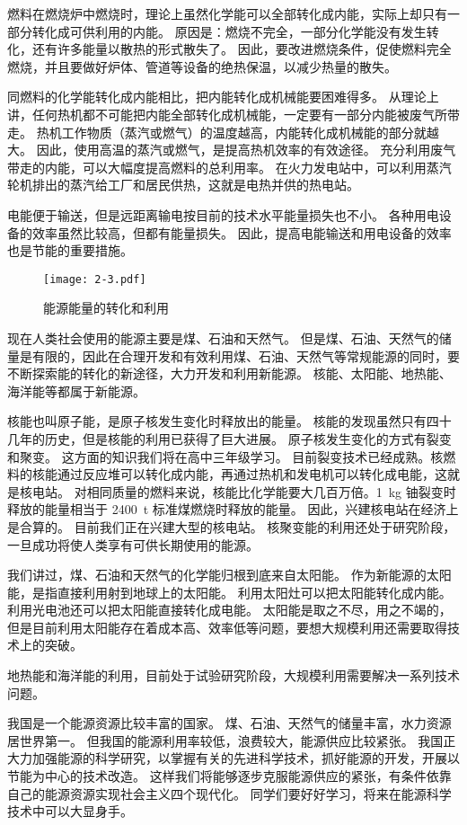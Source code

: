 燃料在燃烧炉中燃烧时，理论上虽然化学能可以全部转化成内能，实际上却只有一部分转化成可供利用的内能。
原因是：燃烧不完全，一部分化学能没有发生转化，还有许多能量以散热的形式散失了。
因此，要改进燃烧条件，促使燃料完全燃烧，并且要做好炉体、管道等设备的绝热保温，以减少热量的散失。

同燃料的化学能转化成内能相比，把内能转化成机械能要困难得多。
从理论上讲，任何热机都不可能把内能全部转化成机械能，一定要有一部分内能被废气所带走。
热机工作物质（蒸汽或燃气）的温度越高，内能转化成机械能的部分就越大。
因此，使用高温的蒸汽或燃气，是提高热机效率的有效途径。
充分利用废气带走的内能，可以大幅度提高燃料的总利用率。
在火力发电站中，可以利用蒸汽轮机排出的蒸汽给工厂和居民供热，这就是电热并供的热电站。

电能便于输送，但是远距离输电按目前的技术水平能量损失也不小。
各种用电设备的效率虽然比较高，但都有能量损失。
因此，提高电能输送和用电设备的效率也是节能的重要措施。

\begin{figure}
	\texttt{[image: 2-3.pdf]}
	\caption{能源能量的转化和利用}\label{fig:2-3}
\end{figure}

现在人类社会使用的能源主要是煤、石油和天然气。
但是煤、石油、天然气的储量是有限的，因此在合理开发和有效利用煤、石油、天然气等常规能源的同时，要不断探索能的转化的新途径，大力开发和利用新能源。
核能、太阳能、地热能、海洋能等都属于新能源。

核能也叫原子能，是原子核发生变化时释放出的能量。
核能的发现虽然只有四十几年的历史，但是核能的利用已获得了巨大进展。
原子核发生变化的方式有裂变和聚变。
这方面的知识我们将在高中三年级学习。
目前裂变技术已经成熟。核燃料的核能通过反应堆可以转化成内能，再通过热机和发电机可以转化成电能，这就是核电站。
对相同质量的燃料来说，核能比化学能要大几百万倍。\qty{1}{kg} 铀裂变时释放的能量相当于 \qty{2400}{t} 标准煤燃烧时释放的能量。
因此，兴建核电站在经济上是合算的。
目前我们正在兴建大型的核电站。
核聚变能的利用还处于研究阶段，一旦成功将使人类享有可供长期使用的能源。

我们讲过，煤、石油和天然气的化学能归根到底来自太阳能。
作为新能源的太阳能，是指直接利用射到地球上的太阳能。
利用太阳灶可以把太阳能转化成内能。
利用光电池还可以把太阳能直接转化成电能。
太阳能是取之不尽，用之不竭的，但是目前利用太阳能存在着成本高、效率低等问题，要想大规模利用还需要取得技术上的突破。

地热能和海洋能的利用，目前处于试验研究阶段，大规模利用需要解决一系列技术问题。

我国是一个能源资源比较丰富的国家。
煤、石油、天然气的储量丰富，水力资源居世界第一。
但我国的能源利用率较低，浪费较大，能源供应比较紧张。
我国正大力加强能源的科学研究，以掌握有关的先进科学技术，抓好能源的开发，开展以节能为中心的技术改造。
这样我们将能够逐步克服能源供应的紧张，有条件依靠自己的能源资源实现社会主义四个现代化。
同学们要好好学习，将来在能源科学技术中可以大显身手。

